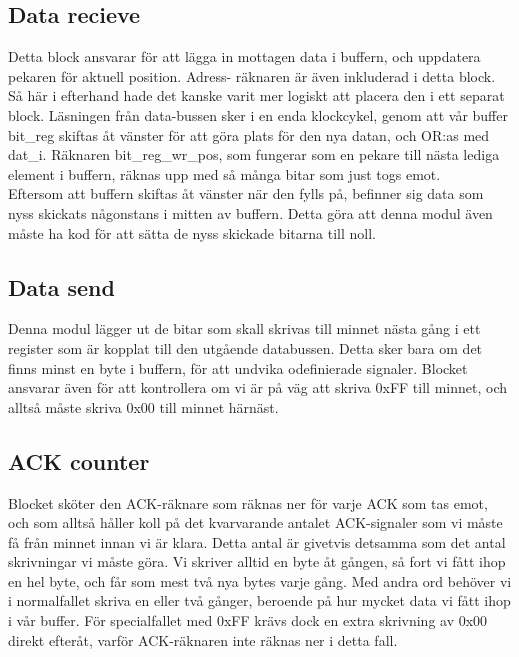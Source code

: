 \documentclass[a4paper]{article}
\begin{document}
\subsection{Data recieve}

Detta block ansvarar för att lägga in mottagen
data i buffern, och uppdatera pekaren för aktuell position. Adress-
räknaren är även inkluderad i detta block. Så här i efterhand hade det
kanske varit mer logiskt att placera den i ett separat block. Läsningen
från data-bussen sker i en enda klockcykel, genom att vår buffer
bit\_reg skiftas åt vänster för att göra plats för den nya datan, och
OR:as med dat\_i. Räknaren bit\_reg\_wr\_pos, som fungerar som en pekare
till nästa lediga element i buffern, räknas upp med så många bitar som
just togs emot.\\

Eftersom att buffern skiftas åt vänster när den fylls på, befinner sig
data som nyss skickats någonstans i mitten av buffern. Detta göra att
denna modul även måste ha kod för att sätta de nyss skickade bitarna
till noll.\\


\subsection{Data send}

Denna modul lägger ut de bitar som skall skrivas
till minnet nästa gång i ett register som är kopplat till den utgående
databussen. Detta sker bara om det finns minst en byte i buffern, för
att undvika odefinierade signaler. Blocket ansvarar även för att
kontrollera om vi är på väg att skriva 0xFF till minnet, och alltså
måste skriva 0x00 till minnet härnäst.


\subsection{ACK counter}

Blocket sköter den ACK-räknare som räknas ner för varje ACK som tas
emot, och som alltså håller koll på det kvarvarande antalet ACK-signaler
som vi måste få från minnet innan vi är klara. Detta antal är givetvis
detsamma som det antal skrivningar vi måste göra. Vi skriver alltid en
byte åt gången, så fort vi fått ihop en hel byte, och får som mest två
nya bytes varje gång. Med andra ord behöver vi i normalfallet skriva en
eller två gånger, beroende på hur mycket data vi fått ihop i vår buffer.
För specialfallet med 0xFF krävs dock en extra skrivning av 0x00 direkt
efteråt, varför ACK-räknaren inte räknas ner i detta fall.
\end{document}
